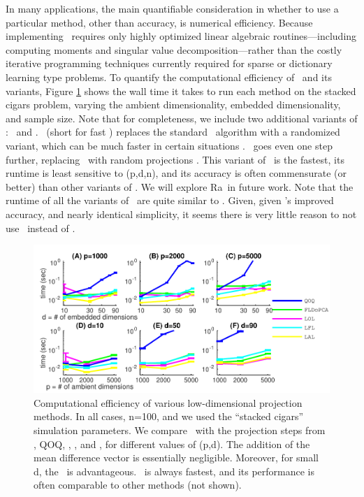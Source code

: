\documentclass[10pt]{article}
\begin{document}
In many applications, the main quantifiable consideration in whether to use a particular method, other than accuracy, is numerical efficiency.  Because implementing \Lol~requires only highly optimized linear algebraic routines---including computing moments and singular value decomposition---rather than the costly iterative programming techniques currently required for sparse or dictionary learning type problems.  To quantify the computational efficiency of \Lol~and its variants, Figure \ref{fig:speed} shows the wall time it takes to run each method on the stacked cigars problem, varying the ambient dimensionality, embedded dimensionality, and sample size.  Note that for completeness, we include two additional variants of \Lol: \Lal~and \Lfl.  \Lfl~(short for fast \Lol) replaces the standard \Svd~algorithm with a randomized variant, which can be much faster in certain situations \cite{Halko2011}.  \Lal~goes even one step further, replacing \Svd~with random projections \cite{Candes06a}.  This variant of \Lol~is the fastest, its runtime is  least sensitive to (p,d,n), and its accuracy is often commensurate (or better) than other variants of \Lol.  We will explore Ra\Lol~in future work.  Note that the runtime of all the variants of \Lol~are quite similar to .  Given, given \Lol's improved accuracy, and nearly identical simplicity, it seems there is very little reason to not use \Lol~instead of .

\begin{figure}[h!]
\centering
\includegraphics[width=1\linewidth]{../Figs/speed_test.pdf}
\caption{
Computational efficiency of various low-dimensional projection methods. In all cases, n=100, and we used the ``stacked cigars'' simulation parameters.   We compare \Pca~with the projection steps from \Lol, QOQ, \Lrl, \Lfl, and \Lal, for different values of (p,d).  The addition of the mean difference vector is essentially negligible.  Moreover, for small d, the \Lfl~is advantageous.  \Lal~is always fastest, and its performance is often comparable to other methods (not shown).
}
\label{fig:speed}
\end{figure}
\end{document}
